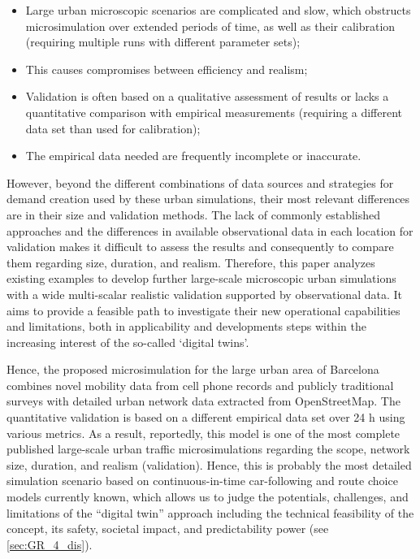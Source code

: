 \begin{itemize}
    \item Large urban microscopic scenarios are complicated and slow, which obstructs microsimulation over extended periods of time, as well as their calibration (requiring multiple runs with different parameter sets);
    \item This causes compromises between efficiency and realism;
    \item Validation is often based on a qualitative assessment of results or lacks a quantitative comparison with empirical measurements (requiring a different data set than used for calibration);
    \item The empirical data needed are frequently incomplete or inaccurate.
\end{itemize}

However, beyond the different combinations of data sources and strategies for demand creation used by these urban simulations, their most relevant differences are in their size and validation methods. The lack of commonly established approaches and the differences in available observational data in each location for validation makes it difficult to assess the results and consequently to compare them regarding size, duration, and realism.
Therefore, this paper analyzes existing examples to develop further large-scale microscopic urban simulations with a wide multi-scalar realistic validation supported by observational data. It aims to provide a feasible path to investigate their new operational capabilities and limitations, both in applicability and developments steps within the increasing interest of the so-called ‘digital twins’.

Hence, the proposed microsimulation for the large urban area of Barcelona combines novel mobility data from cell phone records and publicly traditional surveys with detailed urban network data extracted from OpenStreetMap. The quantitative validation is based on a different empirical data set over 24 h using various metrics. As a result, reportedly, this model is one of the most complete published large-scale urban traffic microsimulations regarding the scope, network size, duration, and realism (validation). Hence, this is probably the most detailed simulation scenario based on continuous-in-time car-following and route choice models currently known, which allows us to judge the potentials, challenges, and limitations of the “digital twin” approach including the technical feasibility of the concept, its safety, societal impact, and predictability power (see \autoref{sec:GR_4_dis}).

